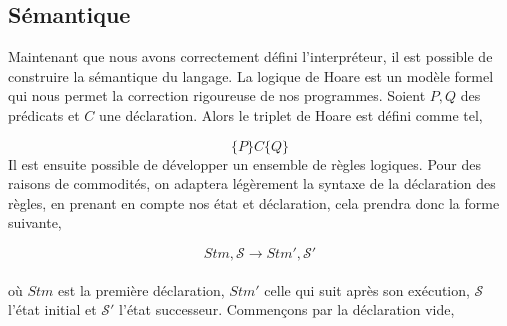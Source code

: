 \subsection{Sémantique}
Maintenant que nous avons correctement défini l'interpréteur, il est possible de construire la sémantique du langage.
La logique de Hoare est un modèle formel qui nous permet la correction rigoureuse de nos programmes. Soient $P, Q$ des 
prédicats et $C$ une déclaration. Alors le triplet de Hoare est défini comme tel,

\[\{P\}C\{Q\}\]
Il est ensuite possible de développer un ensemble de règles logiques. Pour des raisons de commodités, on adaptera légèrement 
la syntaxe de la déclaration des règles, en prenant en compte nos état et déclaration, cela prendra donc la forme suivante,

\[Stm, \mathcal{S} \longrightarrow Stm', \mathcal{S}'\]
\\
où $Stm$ est la première déclaration, $Stm'$ celle qui suit après son exécution, $\mathcal{S}$ l'état initial et $\mathcal{S}'$ 
l'état successeur. Commençons par la déclaration vide,

